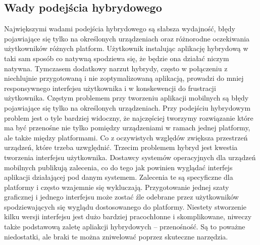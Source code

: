 \documentclass[a4paper]{article}
\begin{document}
\subsection{Wady podejścia hybrydowego}
Największymi wadami podejścia hybrydowego są słabsza wydajność, błędy
pojawiające się tylko na określonych urządzeniach oraz różnorodne oczekiwania
użytkowników różnych platform. Użytkownik instalując aplikację hybrydową w taki sam sposób co 
natywną spodziewa się, że będzie ona działać niczym natywna. Tymczasem
dodatkowy narzut hybrydy, często w połączeniu z niechlujnie przygotowaną i nie
zoptymalizowaną aplikacją, prowadzi do mniej responsywnego interfejsu
użytkownika i w konskewencji do frustracji użytkownika. Częstym problemem przy
tworzeniu aplikacji mobilnych są błędy pojawiające się tylko na określonych
urządzeniach. Przy podejściu hybrydowym problem jest o tyle bardziej widoczny, że
najczęściej tworzymy rozwiązanie które ma być przenośne nie tylko pomiędzy urządzeniami w ramach jednej platformy, ale także między platformami. Co z oczywistych względów zwiększa przestrzeń urządzeń, które trzeba uzwględnić. Trzecim problemem hybryd jest kwestia
tworzenia interfejsu użytkownika. Dostawcy systemów operacyjnych dla urządzeń
mobilnych publikują zalecenia, co do tego jak powinien wyglądać interfejs aplikacji
działającej pod danym systemem. Zalecenia te są specyficzne dla platformy i często
wzajemnie się wykluczają. Przygotowanie jednej szaty graficznej i jednego interfejsu
może zostać źle odebrane przez użytkowników spodziewających się wyglądu
dostosowanego do platformy. Niestety stworzenie kilku wersji interfejsu jest dużo
bardziej pracochłonne i skomplikowane, niweczy także podstawową zaletę apliakcji
hybrydowych – przenośność. 
Są to poważne niedostatki, ale braki te można zniwelować poprzez skuteczne narzędzia.
\end{document}
